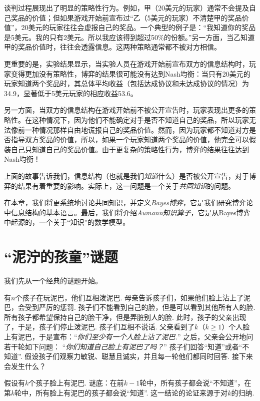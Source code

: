 谈判过程展现出了明显的策略性行为。例如，甲（20美元的玩家）通常不会提及自己奖品的价值；但如果游戏开始前宣布过“乙（5美元的玩家）不清楚甲的奖品价值”，20美元的玩家往往会虚报自己的奖品。一个典型的例子是：“我知道你的奖品是5美元。我的只有2美元。所以我应该得到超过50\%的份额。”另一方面，当乙知道甲的奖品价值时，往往会透露信息。这两种策略通常都不被对方相信。

更重要的是，实验结果显示，当实验人员在游戏开始前宣布双方的信息结构时，玩家变得更加没有策略性，博弈的结果很可能没有达到Nash均衡：当只有20美元的玩家知道两个奖品时，其总体平均收益（包括达成协议和未达成协议的情况）为34.9，显著低于5美元玩家的相应收益53.6。

另一方面，当双方的信息结构在游戏开始前不被公开宣告时，玩家表现出更多的策略性。在这种情况下，因为他们不能确定对手是否不知道自己的奖品，所以玩家无法像前一种情况那样自由地谎报自己的奖品价值。然而，因为玩家都不知道对方是否指导双方奖品的价值，所以，如果一个玩家知道两个奖品的价值，他完全可以假装自己只知道自己的奖品价值。由于更复杂的策略性行为，博弈的结果往往达到Nash均衡！

上面的故事告诉我们，信息结构（也就是我们\emph{知道}什么）是否被公开宣告，对于博弈的结果有着重要的影响。实际上，这一问题是一个关于\emph{共同知识}的问题。

在本章，我们将更系统地讨论共同知识，并定义\emph{Bayes博弈}，它是我们研究博弈论中信息结构的基本语言。最后，我们将介绍\emph{Aumann知识算子}，它是从Bayes博弈中起源的，一个关于“知识”的数学模型。


\section{“泥泞的孩童”谜题}

我们先从一个经典的谜题开始。

有$n$个孩子在玩泥巴，他们互相泼泥巴. 母亲告诉孩子们，如果他们脸上沾上了泥巴，会受到严厉的惩罚. 孩子们不能看到自己的脸，但是可以看到其他所有人的脸. 所有孩子都希望保持自己的脸干净，但是弄脏别人的脸. 此时，孩子的父亲出现了，于是，孩子们停止泼泥巴. 孩子们互相不说话. 父亲看到了$k$（$k\geq 1$）个人脸上有泥巴，于是宣布：“\emph{你们至少有一个人脸上沾了泥巴.}” 之后，父亲会公开地问若干轮如下问题： “\emph{你们知道自己脸上有泥巴了吗？}” 孩子们回答“知道”或者“不知道”. 假设孩子们观察力敏锐、聪慧且诚实，并且每一轮他们都同时回答. 接下来会发生什么？

假设有$k$个孩子脸上有泥巴. 谜底：在前$k-1$轮中，所有孩子都会说“不知道”，在第$k$轮中，所有脸上有泥巴的孩子都会说“知道”. 这一结论的论证来源于对$k$的归纳.

